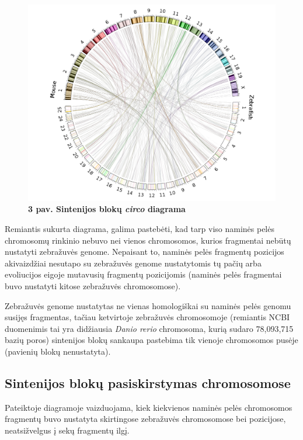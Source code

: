 \documentclass[12pt]{article}
\begin{document}
\begin{figure}[htb]
    \begin{center}
        \includegraphics[width=0.8\linewidth]{../Figures/SynCircos.png}
        \vspace{-1\baselineskip}
        \caption*{\small\textbf{3 pav. Sintenijos blokų \emph{circo}
        diagrama}}
        \label{fig:birds}
    \end{center}
\end{figure}

Remiantis sukurta diagrama, galima pastebėti, kad tarp viso naminės pelės
chromosomų rinkinio nebuvo nei vienos chromosomos, kurios fragmentai nebūtų
nustatyti zebražuvės genome. Nepaisant to, naminės pelės fragmentų
pozicijos akivaizdžiai nesutapo su zebražuvės genome nustatytomis tų pačių
arba evoliucijos eigoje mutavusių fragmentų pozicijomis (naminės pelės
fragmentai buvo nustatyti kitose zebražuvės chromosomose).

Zebražuvės genome nustatytas ne vienas homologiškai su naminės pelės genomu
susijęs fragmentas, tačiau ketvirtoje zebražuvės chromosomoje (remiantis
NCBI\cite{NCBI} duomenimis tai yra didžiausia \emph{Danio rerio} chromosoma,
kurią sudaro 78,093,715 bazių poros) sintenijos blokų sankaupa pastebima
tik vienoje chromosomos pusėje (pavienių blokų nenustatyta).

\subsection{Sintenijos blokų pasiskirstymas chromosomose}
Pateiktoje diagramoje vaizduojama, kiek kiekvienos naminės pelės chromosomos
fragmentų buvo nustatyta skirtingose zebražuvės chromosomose bei pozicijose,
neatsižvelgus į sekų fragmentų ilgį.
\end{document}
